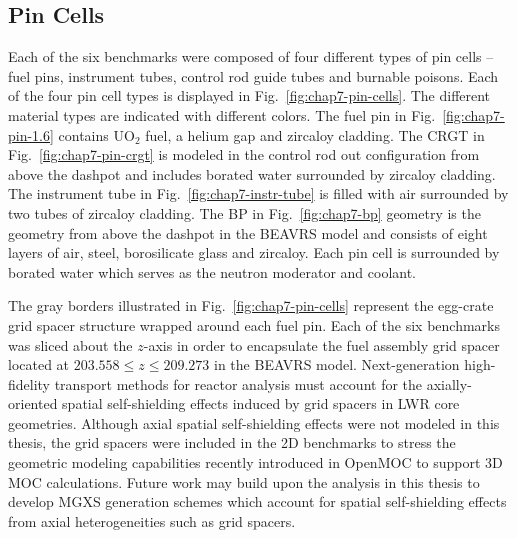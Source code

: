 \subsection{Pin Cells}
\label{subsec:chap7-pin-cells}

Each of the six benchmarks were composed of four different types of pin cells -- fuel pins, instrument tubes, control rod guide tubes and burnable poisons. Each of the four pin cell types is displayed in Fig.~\ref{fig:chap7-pin-cells}. The different material types are indicated with different colors. The fuel pin in Fig.~\ref{fig:chap7-pin-1.6} contains UO$_2$ fuel, a helium gap and zircaloy cladding. The \ac{CRGT} in Fig.~\ref{fig:chap7-pin-crgt} is modeled in the control rod out configuration from above the dashpot and includes borated water surrounded by zircaloy cladding. The instrument tube in Fig.~\ref{fig:chap7-instr-tube} is filled with air surrounded by two tubes of zircaloy cladding. The \ac{BP} in Fig.~\ref{fig:chap7-bp} geometry is the geometry from above the dashpot in the \ac{BEAVRS} model and consists of eight layers of air, steel, borosilicate glass and zircaloy. Each pin cell is surrounded by borated water which serves as the neutron moderator and coolant. 

The gray borders illustrated in Fig.~\ref{fig:chap7-pin-cells} represent the egg-crate grid spacer structure wrapped around each fuel pin. Each of the six benchmarks was sliced about the $z$-axis in order to encapsulate the fuel assembly grid spacer located at $203.558 \le z \le 209.273$ in the \ac{BEAVRS} model. Next-generation high-fidelity transport methods for reactor analysis must account for the axially-oriented spatial self-shielding effects induced by grid spacers in \ac{LWR} core geometries. Although axial spatial self-shielding effects were not modeled in this thesis, the grid spacers were included in the 2D benchmarks to stress the geometric modeling capabilities recently introduced in OpenMOC to support 3D \ac{MOC} calculations. Future work may build upon the analysis in this thesis to develop \ac{MGXS} generation schemes which account for spatial self-shielding effects from axial heterogeneities such as grid spacers.

